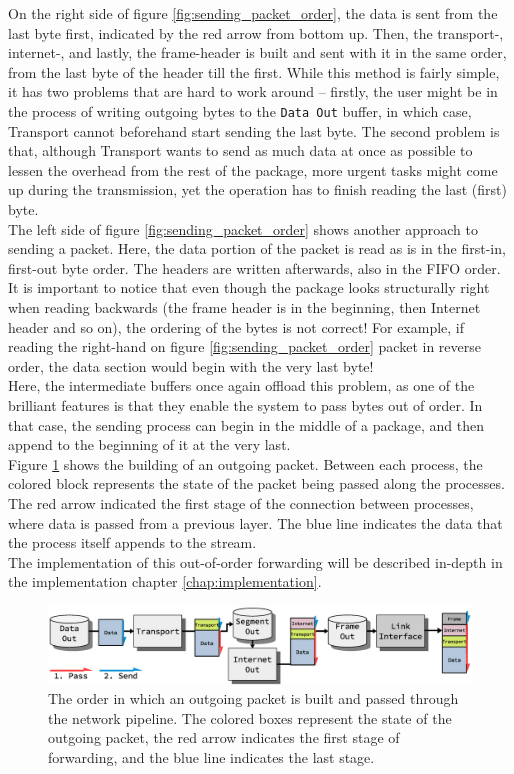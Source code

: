 On the right side of figure \ref{fig:sending_packet_order}, the data is sent 
from the last byte first, indicated by the red arrow from bottom up. Then, the 
transport-, internet-, and lastly, the frame-header is built and sent with it 
in the same order, from the last byte of the header till the first.
While this method is fairly simple, it has two problems that are hard to work
around -- firstly, the user might be in the process of writing outgoing bytes 
to the \texttt{Data Out} buffer, in which case, Transport cannot beforehand 
start sending the last byte. The second problem is that, although Transport 
wants to send as much data at once as possible to lessen the overhead from the 
rest of the package, more urgent tasks might come up during the transmission, 
yet the operation has to finish reading the last (first) byte.\\
The left side of figure \ref{fig:sending_packet_order} shows another approach
to sending a packet. Here, the data portion of the packet is read as is in the 
first-in, first-out byte order. The headers are written afterwards, also in the 
FIFO order. It is important to notice that even though the package looks 
structurally right when reading backwards (the frame header is in the beginning,
then Internet header and so on), the ordering of the bytes is not correct! For 
example, if reading the right-hand on figure \ref{fig:sending_packet_order} 
packet in reverse order, the data section would begin with the very last byte!\\
Here, the intermediate buffers once again offload this problem, as one of the 
brilliant features is that they enable the system to pass bytes out of order.
In that case, the sending process can begin in the middle of a package, and then
append to the beginning of it at the very last.\\
Figure \ref{fig:sending_packet_graph} shows the building of an outgoing packet.
Between each process, the colored block represents the state of the packet 
being passed along the processes. The red arrow indicated the first stage of 
the connection between processes, where data is passed from a previous layer.
The blue line indicates the data that the process itself appends to the stream.\\
The implementation of this out-of-order forwarding will be described in-depth 
in the implementation chapter \ref{chap:implementation}.

\begin{figure}
    \centering
    \includegraphics[scale=0.45]{design/sending_packet_graph.eps}
    \caption{The order in which an outgoing packet is built and passed through the network pipeline.
    The colored boxes represent the state of the outgoing packet, the red arrow
    indicates the first stage of forwarding, and the blue line indicates the last stage.}
    \label{fig:sending_packet_graph}
\end{figure}



